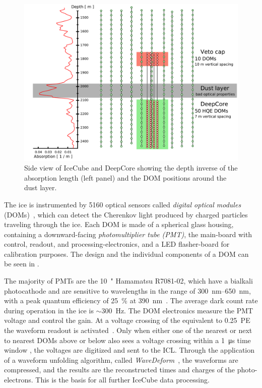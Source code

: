 \begin{figure}[h]
    \includegraphics{figures/icecube_deepcore/DeepCore_sideview.pdf}
	\caption[IceCube side view]{Side view of IceCube and DeepCore showing the depth inverse of the absorption length (left panel) and the DOM positions around the dust layer.}
\end{figure}

The ice is instrumented by 5160 optical sensors called \textit{digital optical modules} (DOMs)~, which can detect the Cherenkov light produced by charged particles traveling through the ice. Each DOM is made of a spherical glass housing, containing a downward-facing \textit{photomultiplier tube (PMT)}, the main-board with control, readout, and processing-electronics, and a LED flasher-board for calibration purposes. The design and the individual components of a DOM can be seen in .

The majority of PMTs are the \SI{10}{"} Hamamatsu R7081-02, which have a bialkali photocathode and are sensitive to wavelengths in the range of \SIrange{300}{650}{\nano\meter}, with a peak quantum efficiency of \SI{25}{\percent} at \SI{390}{\nano\meter}~. The average dark count rate during operation in the ice is $\sim$\SI{300}{\hertz}. The DOM electronics measure the PMT voltage and control the gain. At a voltage crossing of the equivalent to \SI{0.25}{PE} the waveform readout is activated~\cite{ABBASI2009294_data_acquisition}. Only when either one of the nearest or next to nearest DOMs above or below also sees a voltage crossing within a \SI{1}{\micro\second} time window , the voltages are digitized and sent to the ICL. Through the application of a waveform unfolding algorithm, called \textit{WaveDeform}~, the waveforms are compressed, and the results are the reconstructed times and charges of the photo-electrons. This is the basis for all further IceCube data processing.

